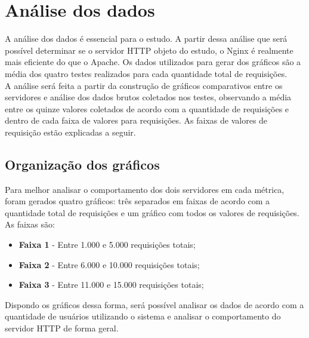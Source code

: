 \chapter{Análise dos dados}\label{cap:analise-dos-dados}
A análise dos dados é essencial para o estudo. A partir dessa análise que 
será possível determinar se o servidor HTTP objeto do estudo, o Nginx é 
realmente mais eficiente do que o Apache. Os dados utilizados para gerar dos 
gráficos são a média dos quatro testes realizados para cada quantidade total de 
requisições.\\
A análise será feita a partir da construção de gráficos comparativos entre os 
servidores e análise dos dados brutos coletados nos testes, observando a média 
entre os quinze valores coletados de acordo com a quantidade de requisições e 
dentro de cada faixa de valores para requisições. As faixas de valores de 
requisição estão explicadas a seguir.
\section{Organização dos gráficos}
Para melhor analisar o comportamento dos dois servidores em cada métrica, foram 
gerados quatro gráficos: três separados em faixas de 
acordo com a quantidade total de requisições e um gráfico com todos os valores 
de requisições. As faixas são:
\begin{itemize}
	\item \textbf{Faixa 1} - Entre 1.000 e 5.000 requisições totais;
	\item \textbf{Faixa 2} - Entre 6.000 e 10.000 requisições totais;
	\item \textbf{Faixa 3} - Entre 11.000 e 15.000 requisições totais;
\end{itemize}
Dispondo os gráficos dessa forma, será possível analisar os dados de acordo com 
a quantidade de usuários utilizando o sistema e analisar o comportamento do 
servidor HTTP de forma geral.


%
